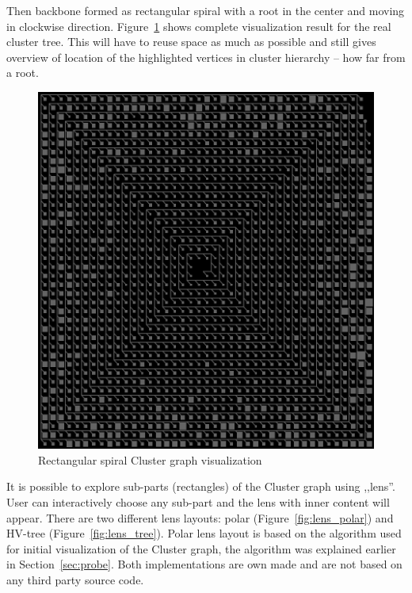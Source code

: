 Then backbone formed as rectangular spiral with a root in the center and moving in clockwise direction. Figure~\ref{fig:cluster_visualisation} shows complete visualization result for the real cluster tree. This will have to reuse space as much as possible and still gives overview of location of the highlighted vertices in cluster hierarchy -- how far from a root.

\begin{figure}[h!]
\centering
\includegraphics[scale=0.4]{pictures/cluster_spiral_visualisation.png}
\caption{Rectangular spiral Cluster graph visualization}
\label{fig:cluster_visualisation}
\end{figure}

It is possible to explore sub-parts (rectangles) of the Cluster graph using ,,lens''. User can interactively choose any sub-part and the lens with inner content will appear. There are two different lens layouts: polar (Figure~\ref{fig:lens_polar}) and HV-tree (Figure~\ref{fig:lens_tree}). Polar lens layout is based on the algorithm used for initial visualization of the Cluster graph, the algorithm was explained earlier in Section~\ref{sec:probe}. Both implementations are own made and are not based on any third party source code.

